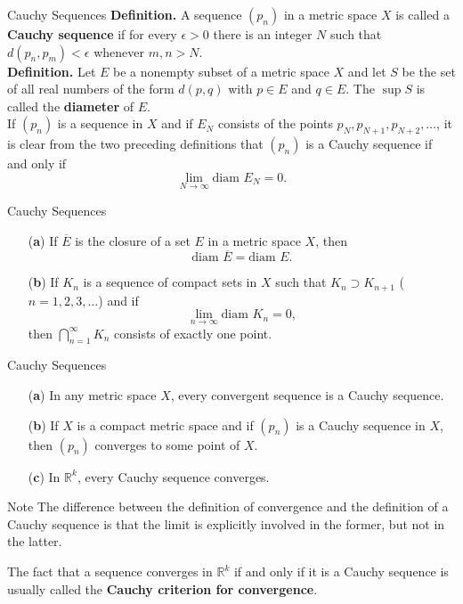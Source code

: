 \documentclass{beamer}
\begin{document}
\begin{frame}{Cauchy Sequences}
\textbf{Definition.} A sequence $(p_n)$ in a metric space $X$ is called a
\textbf{Cauchy sequence} if for every $\epsilon > 0$ there is an integer $N$
such that $d(p_n, p_m) < \epsilon$ whenever $m, n > N$. \\ 

\textbf{Definition.} Let $E$ be a nonempty subset of a metric space $X$ and let
$S$ be the set of all real numbers of the form $d(p, q)$ with $p \in E$ and $q
\in E$. The $\sup S$ is called the \textbf{diameter} of $E$.\\ 

If $(p_n)$ is a sequence in $X$ and if $E_N$ consists of the points $p_N,
p_{N+1}, p_{N+2}, \dotsc$, it is clear from the two preceding definitions that
$(p_n)$ is a Cauchy sequence if and only if
\[
\lim_{N \to \infty} \text{diam } E_N = 0.
\]
\end{frame}
\begin{frame}{Cauchy Sequences}
  \begin{theorem}
\begin{enumerate}
    \item[(\textbf{a})] If $\overline{E}$ is the closure of a set $E$ in a
    metric space $X$, then
    \[
    \text{diam } \overline{E} = \text{diam } E.
    \]
    
    \item[(\textbf{b})] If $K_n$ is a sequence of compact sets in $X$ such that
    $K_n \supset K_{n+1}$ ($n = 1, 2, 3, \dotsc$) and if
    \[
    \lim_{n \to \infty} \text{diam } K_n = 0,
    \]
    then $\bigcap_{n=1}^{\infty} K_n$ consists of exactly one point.
\end{enumerate}
\end{theorem}
\end{frame} 
\begin{frame}{Cauchy Sequences}
  \begin{theorem}
\begin{enumerate}
    \item[(\textbf{a})] In any metric space $X$, every convergent sequence is a
    Cauchy sequence.
    \item[(\textbf{b})] If $X$ is a compact metric space and if $(p_n)$ is a
    Cauchy sequence in $X$, then $(p_n)$ converges to some point of $X$.
    \item[(\textbf{c})] In $\mathbb{R}^k$, every Cauchy sequence converges.
\end{enumerate}
\end{theorem}
\begin{block}{Note}
The difference between the definition of convergence and the definition of a
Cauchy sequence is that the limit is explicitly involved in the former, but not
in the latter.

The fact that a sequence converges in $\mathbb{R}^k$ if and only if it is a
Cauchy sequence is usually called the \textbf{Cauchy criterion for convergence}.
\end{block}
\end{frame}
\end{document}
